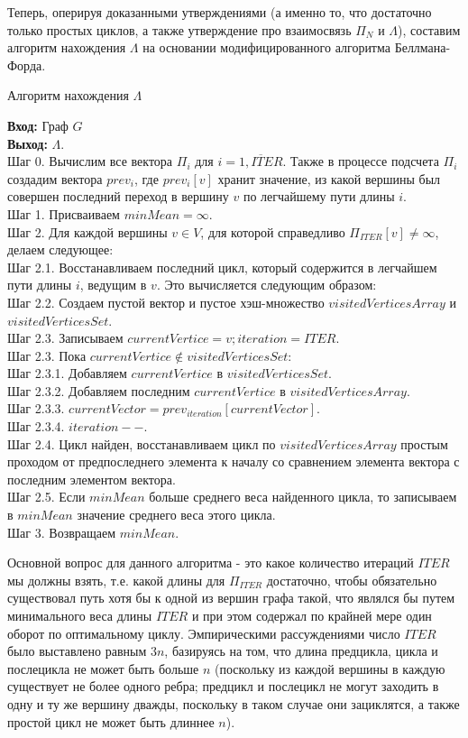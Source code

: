 \documentclass[a4paper,12pt]{extarticle}
\theoremstyle{plain} %
\begin{document}
\begin{large}
Теперь, оперируя доказанными утверждениями (а именно то, что достаточно только простых циклов, а также утверждение про взаимосвязь $\Pi_N$ и $\Lambda$), составим алгоритм нахождения $\Lambda$ на основании модифицированного алгоритма Беллмана-Форда.

\begin{algorithm}[H]
\caption{Алгоритм нахождения $\Lambda$}
\label{diff_graph_construct}
\textbf{Вход:} Граф $G$\\
\textbf{Выход:} $\Lambda$.\\
Шаг 0. Вычислим все вектора $\Pi_i$ для $i = \overline{1, ITER}$. Также в процессе подсчета $\Pi_i$ создадим вектора $prev_i$, где $prev_i[v]$ хранит значение, из какой вершины был совершен последний переход в вершину $v$ по легчайшему пути длины $i$.\\
Шаг 1. Присваиваем $minMean = \infty$.\\
Шаг 2. Для каждой вершины $v \in V$, для которой справедливо $\Pi_{ITER}[v] \ne \infty$, делаем следующее:\\
Шаг 2.1. Восстанавливаем последний цикл, который содержится в легчайшем пути длины $i$, ведущим в $v$. Это вычисляется следующим образом:\\
Шаг 2.2. Создаем пустой вектор и пустое хэш-множество $visitedVerticesArray$ и $visitedVerticesSet$.\\
Шаг 2.3. Записываем $currentVertice = v; iteration = ITER$.\\
Шаг 2.3. Пока $currentVertice \notin visitedVerticesSet$:\\
Шаг 2.3.1. Добавляем $currentVertice$ в $visitedVerticesSet$.\\
Шаг 2.3.2. Добавляем последним $currentVertice$ в $visitedVerticesArray$.\\
Шаг 2.3.3. $currentVector = prev_{iteration}[currentVector]$.\\
Шаг 2.3.4. $iteration--$.\\
Шаг 2.4. Цикл найден, восстанавливаем цикл по $visitedVerticesArray$ простым проходом от предпоследнего элемента к началу со сравнением элемента вектора с последним элементом вектора.\\
Шаг 2.5. Если $minMean$ больше среднего веса найденного цикла, то записываем в $minMean$ значение среднего веса этого цикла.\\
Шаг 3. Возвращаем $minMean$.\\ 
\end{algorithm}

Основной вопрос для данного алгоритма - это какое количество итераций $ITER$ мы должны взять, т.е. какой длины для $\Pi_{ITER}$ достаточно, чтобы обязательно существовал путь хотя бы к одной из вершин графа такой, что являлся бы путем минимального веса длины $ITER$ и при этом содержал по крайней мере один оборот по оптимальному циклу. Эмпирическими рассуждениями число $ITER$ было выставлено равным $3n$, базируясь на том, что длина предцикла, цикла и послецикла не может быть больше $n$ (поскольку из каждой вершины в каждую существует не более одного ребра; предцикл и послецикл не могут заходить в одну и ту же вершину дважды, поскольку в таком случае они зациклятся, а также простой цикл не может быть длиннее $n$).


\end{large}
\end{document}
